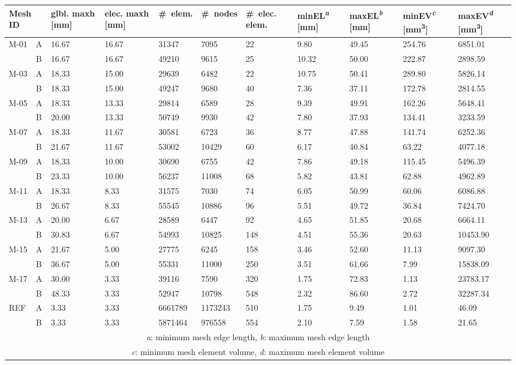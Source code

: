 \begin{tabular}{p{0.7cm}p{0.2cm}p{1cm}p{1cm}|p{1.4cm}p{1.4cm}p{1cm}|p{1.3cm}p{1.3cm}p{1.3cm}p{1.3cm}}
\multicolumn{2}{l}{Mesh ID} & glbl. maxh [mm] & elec. maxh [mm] & \#~elem. & \#~nodes & \#~elec. elem. & minEL\textsuperscript{\emph{a}} [mm] & maxEL\textsuperscript{\emph{b}} [mm] & minEV\textsuperscript{\emph{c}} [mm\textsuperscript{3}] & maxEV\textsuperscript{\emph{d}} [mm\textsuperscript{3}]\\ \hline 
\multirow{2}{*}{M-01} &A & 16.67 & 16.67 & 31347 & 7095 & 22 & 9.80 & 49.45 & 254.76 & 6851.01\\ 
& B & 16.67 & 16.67 & 49210 & 9615 & 25 & 10.32 & 50.00 & 222.87 & 2898.59\\ 
\multirow{2}{*}{M-03} &A & 18.33 & 15.00 & 29639 & 6482 & 22 & 10.75 & 50.41 & 289.80 & 5826.14\\ 
& B & 18.33 & 15.00 & 49247 & 9680 & 40 & 7.36 & 37.11 & 172.78 & 2814.55\\ 
\multirow{2}{*}{M-05} &A & 18.33 & 13.33 & 29814 & 6589 & 28 & 9.39 & 49.91 & 162.26 & 5648.41\\ 
& B & 20.00 & 13.33 & 50749 & 9930 & 42 & 7.80 & 37.93 & 134.41 & 3233.59\\ 
\multirow{2}{*}{M-07} &A & 18.33 & 11.67 & 30581 & 6723 & 36 & 8.77 & 47.88 & 141.74 & 6252.36\\ 
& B & 21.67 & 11.67 & 53002 & 10429 & 60 & 6.17 & 40.84 & 63.22 & 4077.18\\ 
\multirow{2}{*}{M-09} &A & 18.33 & 10.00 & 30690 & 6755 & 42 & 7.86 & 49.18 & 115.45 & 5496.39\\ 
& B & 23.33 & 10.00 & 56237 & 11008 & 68 & 5.82 & 43.81 & 62.88 & 4962.89\\ 
\multirow{2}{*}{M-11} &A & 18.33 & 8.33 & 31575 & 7030 & 74 & 6.05 & 50.99 & 60.06 & 6086.88\\ 
& B & 26.67 & 8.33 & 55545 & 10886 & 96 & 5.51 & 49.72 & 36.84 & 7424.70\\ 
\multirow{2}{*}{M-13} &A & 20.00 & 6.67 & 28589 & 6447 & 92 & 4.65 & 51.85 & 20.68 & 6664.11\\ 
& B & 30.83 & 6.67 & 54993 & 10825 & 148 & 4.51 & 55.36 & 20.63 & 10453.90\\ 
\multirow{2}{*}{M-15} &A & 21.67 & 5.00 & 27775 & 6245 & 158 & 3.46 & 52.60 & 11.13 & 9097.30\\ 
& B & 36.67 & 5.00 & 55331 & 11000 & 250 & 3.51 & 61.66 & 7.99 & 15838.09\\ 
\multirow{2}{*}{M-17} &A & 30.00 & 3.33 & 39116 & 7590 & 320 & 1.75 & 72.83 & 1.13 & 23783.17\\ 
& B & 48.33 & 3.33 & 52947 & 10798 & 548 & 2.32 & 86.60 & 2.72 & 32287.34\\ \hline 
\multirow{2}{*}{REF} &A & 3.33 & 3.33 & 6661789 & 1173243 & 510 & 1.75 & 9.49 & 1.01 & 46.09\\ 
& B & 3.33 & 3.33 & 5871464 & 976558 & 554 & 2.10 & 7.59 & 1.58 & 21.65\\ 
\multicolumn{11}{c}{\emph{a}: minimum mesh edge length, \emph{b}: maximum mesh edge length}\\ 
\multicolumn{11}{c}{\emph{c}: minimum mesh element volume, \emph{d}: maximum mesh element volume}\\ 
\end{tabular}
